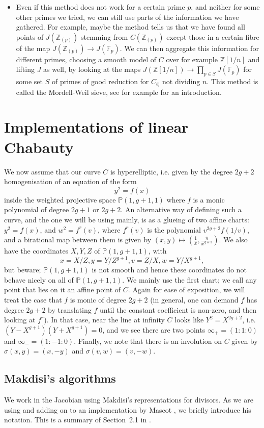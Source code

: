 \documentclass[12pt]{article}
\newcommand{\Z}{\mathbb{Z}}
\newcommand{\Q}{\mathbb{Q}}
\renewcommand{\P}{\mathbb{P}}
\newcommand{\F}{\mathbb{F}}
\theoremstyle{plain}
\theoremstyle{definition}
\theoremstyle{remark}
\begin{document}
\begin{itemize}
\item Even if this method does not work for a certain prime $p$, and neither for some other primes we tried, we can still use parts of the information we have gathered. For example, maybe the method tells us that we have found all points of $J(\Z_{(p)})$ stemming from $C(\Z_{(p)})$ except those in a certain fibre of the map $J(\Z_{(p)}) \to J(\F_p)$. We can then aggregate this information for different primes, choosing a smooth model of $C$ over for example $\Z[1/n]$ and lifting $J$ as well, by looking at the maps $J(\Z[1/n]) \to \prod_{p \in S} J(\F_p)$ for some set $S$ of primes of good reduction for $C_{\Q}$ not dividing $n$. This method is called the Mordell-Weil sieve, see for example \cite{stoll10} for an introduction.
\end{itemize}

\section{Implementations of linear Chabauty}
\label{section:explicit}
We now assume that our curve $C$ is hyperelliptic, i.e. given by the degree $2g+2$ homogenisation of an equation of the form
\[
y^2 = f(x)
\]
inside the weighted projective space $\P(1,g+1,1)$ where $f$ is a monic polynomial of degree $2g+1$ or $2g+2$. An alternative way of defining such a curve, and the one we will be using mainly, is as a glueing of two affine charts: $y^2 = f(x)$, and $w^2 = f^{r}(v)$, where $f^{r}(v)$ is the polynomial $v^{2g + 2} f(1/v)$, and a birational map between them is given by $(x,y) \mapsto (\frac{1}{x},\frac{y}{x^{g+1}})$. We also have the coordinates $X,Y,Z$ of $\P(1,g+1,1)$, with \[x = X/Z, y = Y/Z^{g+1}, v = Z/X, w = Y/X^{g+1},\] but beware; $\P(1,g+1,1)$ is not smooth and hence these coordinates do not behave nicely on all of $\P(1,g+1,1)$. We mainly use the first chart; we call any point that lies on it an affine point of $C$. Again for ease of exposition, we will treat the case that $f$ is monic of degree $2g+2$ (in general, one can demand $f$ has degree $2g+2$ by translating $f$ until the constant coefficient is non-zero, and then looking at $f^r$). In that case, near the line at infinity $C$ looks like $Y^2 = X^{2g+2}$, i.e. $(Y-X^{g+1})(Y+X^{g+1}) = 0$, and we see there are two points $\infty_+ = (1:1:0)$ and $\infty_- = (1:-1:0)$. Finally, we note that there is an involution on $C$ given by $\sigma(x,y) = (x,-y)$ and $\sigma(v,w) = (v,-w)$.

\subsection{Makdisi's algorithms}
We work in the Jacobian using Makdisi's representations for divisors. As we are using and adding on to an implementation by Mascot \cite{mascot18}, we briefly introduce his notation. This is a summary of Section~2.1 in \cite{mascot18}.
\end{document}
